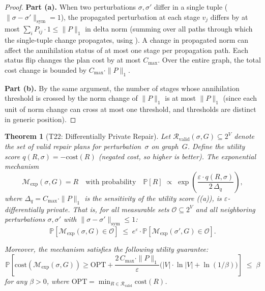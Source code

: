 \documentclass[11pt,a4paper]{article}
\newtheorem{theorem}{Theorem}[section]
\theoremstyle{definition}
\newcommand{\cost}{\mathrm{cost}}
\newcommand{\OPT}{\mathrm{OPT}}
\newcommand{\bbP}{\mathbb{P}}
\newcommand{\cR}{\mathcal{R}}
\begin{document}
\begin{proof}
\textbf{Part (a).}
When two perturbations $\sigma, \sigma'$ differ in a single tuple
($\|\sigma - \sigma'\|_{\mathrm{sym}} = 1$), the propagated perturbation
at each stage $v_j$ differs by at most $\sum_i P_{ij} \cdot 1 \leq \|P\|_1$
in delta norm (summing over all paths through which the single-tuple change
propagates, using ).  A change in propagated norm
can affect the annihilation status of at most one stage per propagation path.
Each status flip changes the plan cost by at most $C_{\max}$.
Over the entire graph, the total cost change is bounded by
$C_{\max} \cdot \|P\|_1$.

\textbf{Part (b).}
By the same argument, the number of stages whose annihilation threshold is
crossed by the norm change of $\|P\|_1$ is at most $\|P\|_1$ (since each
unit of norm change can cross at most one threshold, and thresholds are
distinct in generic position).
\end{proof}

\begin{theorem}[T22: Differentially Private Repair]\label{thm:dp-repair}
Let $\cR_{\mathrm{valid}}(\sigma, G) \subseteq 2^V$ denote the set of valid
repair plans for perturbation~$\sigma$ on graph~$G$.  Define the
\emph{utility score} $q(R, \sigma) = -\cost(R)$ (negated cost, so higher is
better).  The \emph{exponential mechanism}
\begin{equation}\label{eq:exp-mechanism}
  \mathcal{M}_{\mathrm{exp}}(\sigma, G) = R
  \quad\text{with probability}\quad
  \bbP[R] \;\propto\; \exp\!\left(\frac{\varepsilon \cdot q(R, \sigma)}
    {2\,\Delta_q}\right),
\end{equation}
where $\Delta_q = C_{\max} \cdot \|P\|_1$ is the sensitivity of the utility
score ((a)), is $\varepsilon$-differentially
private.  That is, for all measurable sets $\mathcal{O} \subseteq 2^V$ and
all neighboring perturbations $\sigma, \sigma'$ with
$\|\sigma - \sigma'\|_{\mathrm{sym}} \leq 1$:
\begin{equation}\label{eq:dp-guarantee}
  \bbP[\mathcal{M}_{\mathrm{exp}}(\sigma, G) \in \mathcal{O}]
  \;\leq\;
  e^{\varepsilon} \cdot
  \bbP[\mathcal{M}_{\mathrm{exp}}(\sigma', G) \in \mathcal{O}].
\end{equation}

Moreover, the mechanism satisfies the following utility guarantee:
\begin{equation}\label{eq:dp-utility}
  \bbP\!\left[\cost(\mathcal{M}_{\mathrm{exp}}(\sigma, G))
    \geq \OPT + \frac{2\,C_{\max} \cdot \|P\|_1}{\varepsilon}
    \bigl(|V| \cdot \ln|V| + \ln(1/\beta)\bigr)\right]
  \;\leq\; \beta
\end{equation}
for any $\beta > 0$, where $\OPT = \min_{R \in \cR_{\mathrm{valid}}} \cost(R)$.
\end{theorem}
\end{document}
